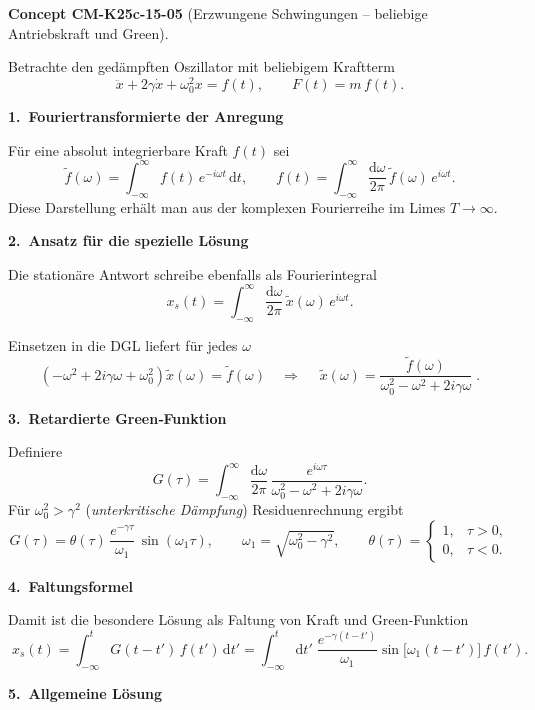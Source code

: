 \documentclass[10pt, letterpaper]{article}
\newcommand{\CustomHeading}[3]{%
  \par\medskip\noindent%
  \textbf{#1 #2} \textnormal{(#3)}.\enskip%
}
\newenvironment{CONC}[2]{\begin{unitbox}\CustomHeading{Concept}{#1}{#2}}{\end{unitbox}}
\begin{document}
\begin{CONC}{CM-K25c-15-05}{Erzwungene Schwingungen – beliebige Antriebskraft und Green}
Betrachte den gedämpften Oszillator mit beliebigem Kraft­term
\[
  \ddot x+2\gamma\dot x+\omega_{0}^{2}x=f(t),
  \qquad 
  F(t)=m\,f(t).
\]

\textbf{1.\ Fourier­transformierte der Anregung}

Für eine absolut integrierbare Kraft $f(t)$ sei  
\[
  \tilde f(\omega)=\int_{-\infty}^{\infty}\!f(t)\,e^{-i\omega t}\,\mathrm dt,
  \qquad
  f(t)=\int_{-\infty}^{\infty}
          \frac{\mathrm d\omega}{2\pi}\,
          \tilde f(\omega)\,e^{i\omega t}.
\]
Diese Darstellung erhält man aus der komplexen Fourier­reihe im Limes
\(T\to\infty\).

\textbf{2.\ Ansatz für die spezielle Lösung}

Die stationäre Antwort schreibe ebenfalls als Fourier­integral
\[
  x_s(t)=\int_{-\infty}^{\infty}
           \frac{\mathrm d\omega}{2\pi}\,
           \tilde x(\omega)\,e^{i\omega t}.
\]

Einsetzen in die DGL liefert für jedes \(\omega\)
\[
  (-\omega^{2}+2i\gamma\omega+\omega_{0}^{2})\tilde x(\omega)=\tilde f(\omega)
  \quad\Longrightarrow\quad
  \boxed{\;
    \tilde x(\omega)=
      \frac{\tilde f(\omega)}
           {\omega_{0}^{2}-\omega^{2}+2i\gamma\omega}}\;.
\]

\textbf{3.\ Retardierte Green‐Funktion}

Definiere
\[
  G(\tau)=
  \int_{-\infty}^{\infty}
     \frac{\mathrm d\omega}{2\pi}\,
     \frac{e^{i\omega\tau}}
          {\omega_{0}^{2}-\omega^{2}+2i\gamma\omega}.
\]
Für \(\omega_{0}^{2}>\gamma^{2}\) (\emph{unterkritische Dämpfung})  
Residuenrechnung ergibt
\[
  G(\tau)=
  \theta(\tau)\,
  \frac{e^{-\gamma\tau}}{\omega_{1}}\,
  \sin(\omega_{1}\tau),
  \qquad
  \omega_{1}=\sqrt{\omega_{0}^{2}-\gamma^{2}},
  \qquad
  \theta(\tau)=
  \begin{cases}
    1,&\tau>0,\\
    0,&\tau<0.
  \end{cases}
\]

\textbf{4.\ Faltungsformel}

Damit ist die besondere Lösung als Faltung von Kraft und Green‐Funktion
\[
  \boxed{\;
    x_s(t)=
      \int_{-\infty}^{t}\!G(t-t')\,f(t')\,\mathrm dt'}
  =
  \int_{-\infty}^{t}\!
     \mathrm dt'\;
     \frac{e^{-\gamma(t-t')}}{\omega_{1}}
     \sin\bigl[\omega_{1}(t-t')\bigr]\,
     f(t').
\]

\textbf{5.\ Allgemeine Lösung}


\end{CONC}
\end{document}
